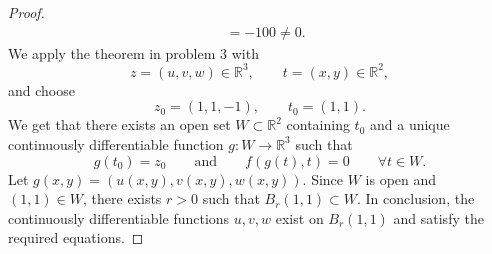 \begin{proof}
\[\begin{aligned}
    &= -100 \neq 0.
    \end{aligned}
    \]
    We apply the theorem in problem 3 with
    \[
    z=(u,v,w) \in \mathbb{R}^3, \qquad t=(x,y) \in \mathbb{R}^2,
    \]
    and choose
    \[
    z_0=(1,1,-1), \qquad t_0=(1,1).
    \]
    We get that there exists an open set $W\subset\mathbb{R}^2$ containing $t_0$ and a unique continuously differentiable function $g:W\to\mathbb{R}^3$ such that
    \[
    g(t_0)=z_0 \qquad \text{and} \qquad f(g(t), t)=0 \qquad \forall t \in W.
    \]
    Let $g(x,y) = (u(x,y), v(x,y), w(x,y))$. Since $W$ is open and $(1,1) \in W$, there exists $r>0$ such that $B_r(1,1) \subset W$. In conclusion, the continuously differentiable functions $u, v, w$ exist on $B_r(1,1)$ and satisfy the required equations.
\end{proof}